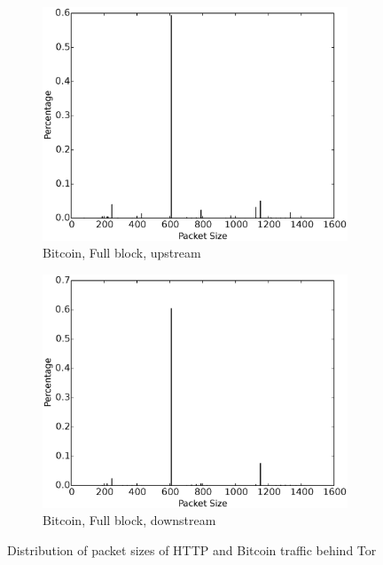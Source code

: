 \begin{figure}[t]
\begin{subfigure}{0.48\linewidth}
\centering
\includegraphics[width=\linewidth]{image/tor_fullblock_pkt_size_upstream.eps}
\caption{Bitcoin, Full block, upstream}
\label{fig:tor_fullblock_pkt_size_upstream}
\end{subfigure}
\begin{subfigure}{0.48\linewidth}
\centering
\includegraphics[width=\linewidth]{image/tor_fullblock_pkt_size_downstream.eps}
\caption{Bitcoin, Full block, downstream}
\label{fig:tor_fullblock_pkt_size_downstream}
\end{subfigure}
\caption{Distribution of packet sizes of HTTP and Bitcoin traffic behind Tor}
\end{figure}





 



 





